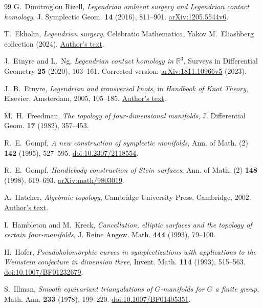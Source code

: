 \documentclass[11pt]{amsart}
\theoremstyle{definition}
\theoremstyle{remark}
\begin{document}
\begin{thebibliography}{99}
G.~Dimitroglou Rizell, \emph{Legendrian ambient surgery and
Legendrian contact homology}, J. Symplectic Geom. \textbf{14}
(2016), 811--901.
\href{https://arxiv.org/abs/1205.5544v6}{arXiv:1205.5544v6}.

T.~Ekholm, \emph{Legendrian surgery}, Celebratio Mathematica,
Yakov M.~Eliashberg collection (2024).
\href{https://celebratio.org/Eliashberg_Y/article/1191/}{Author's text}.

J.~Etnyre and L.~Ng, \emph{Legendrian contact homology in
$\mathbb R^3$}, Surveys in Differential Geometry \textbf{25}
(2020), 103--161. Corrected version:
\href{https://arxiv.org/abs/1811.10966v5}{arXiv:1811.10966v5} (2023).

J.~B.~Etnyre, \emph{Legendrian and transversal knots},
in \emph{Handbook of Knot Theory}, Elsevier, Amsterdam, 2005,
105--185.
\href{https://etnyre.math.gatech.edu/preprints/papers/legsur.pdf}{Author's text}.

M.~H.~Freedman, \emph{The topology of four-dimensional manifolds},
J. Differential Geom. \textbf{17} (1982), 357--453.

R.~E.~Gompf, \emph{A new construction of symplectic manifolds},
Ann. of Math. (2) \textbf{142} (1995), 527--595.
\href{https://doi.org/10.2307/2118554}{doi:10.2307/2118554}.

R.~E.~Gompf, \emph{Handlebody construction of Stein surfaces},
Ann. of Math. (2) \textbf{148} (1998), 619--693.
\href{https://arxiv.org/abs/math/9803019}{arXiv:math/9803019}.

A.~Hatcher, \emph{Algebraic topology}, Cambridge University Press,
Cambridge, 2002. \href{https://pi.math.cornell.edu/~hatcher/AT/AT.pdf}{Author's text}.

I.~Hambleton and M.~Kreck, \emph{Cancellation, elliptic surfaces
and the topology of certain four-manifolds}, J. Reine Angew. Math.
\textbf{444} (1993), 79--100.

H.~Hofer, \emph{Pseudoholomorphic curves in symplectizations with
applications to the Weinstein conjecture in dimension three},
Invent. Math. \textbf{114} (1993), 515--563.
\href{https://doi.org/10.1007/BF01232679}{doi:10.1007/BF01232679}.

S.~Illman, \emph{Smooth equivariant triangulations of $G$-manifolds
for $G$ a finite group}, Math. Ann. \textbf{233} (1978), 199--220.
\href{https://doi.org/10.1007/BF01405351}{doi:10.1007/BF01405351}.


\end{thebibliography}
\end{document}
